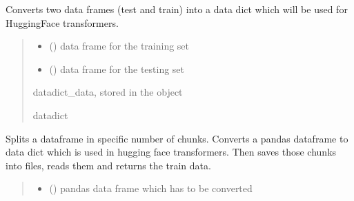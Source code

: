 \documentclass[letterpaper,10pt,english]{sphinxmanual}
\begin{document}
\begin{fulllineitems}
\begin{fulllineitems}
\label{\detokenize{BeeClassification:BeeClassification.BeeClassification.dataframe_to_datadict}}
\pysigstartsignatures
{}
\pysigstopsignatures
\sphinxAtStartPar
Converts two data frames (test and train) into a data dict which will be used for HuggingFace transformers.
\begin{quote}\begin{description}
\begin{itemize}
\item {} 
\sphinxAtStartPar
{} () \textendash{} data frame for the training set

\item {} 
\sphinxAtStartPar
{} () \textendash{} data frame for the testing set

\end{itemize}

\sphinxAtStartPar
datadict\_data, stored in the object

\sphinxAtStartPar
datadict

\end{description}\end{quote}

\end{fulllineitems}


\begin{fulllineitems}
\label{\detokenize{BeeClassification:BeeClassification.BeeClassification.dataframe_to_dataset}}
\pysigstartsignatures
{}
\pysigstopsignatures
\sphinxAtStartPar
Splits a dataframe in specific number of chunks. Converts a pandas dataframe to data dict which is used in hugging face transformers. Then saves those chunks into files, reads them and returns the train data.
\begin{quote}\begin{description}
\begin{itemize}
\item {} 
\sphinxAtStartPar
{} () \textendash{} pandas data frame which has to be converted


\end{itemize}
\end{description}
\end{quote}
\end{fulllineitems}
\end{fulllineitems}
\end{document}
